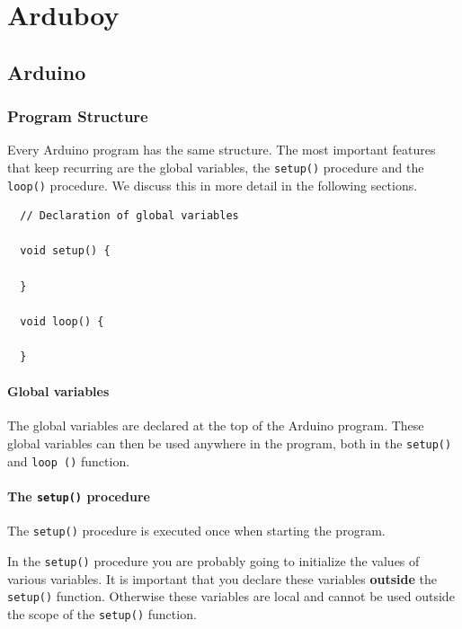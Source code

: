 \documentclass[11pt,fleqn]{book} %
\begin{document}
\part{Arduboy}

\chapter{Arduino}
\section{Program Structure}
Every Arduino program has the same structure. The most important features that keep recurring are the global variables, the \texttt{setup()} procedure and the \texttt{loop()} procedure. We discuss this in more detail in the following sections.

\begin{definition}
	\phantom{}
	\begin{verbatim}
  // Declaration of global variables

  void setup() {

  }

  void loop() {

  }
	\end{verbatim}
	\vspace{0cm}
\end{definition}

\subsection{Global variables}
The global variables are declared at the top of the Arduino program. These global variables can then be used anywhere in the program, both in the \texttt{setup()} and \texttt{loop ()} function.

\subsection{The \texttt{setup()} procedure}
The \texttt{setup()} procedure is executed once when starting the program.

\begin{remark}
    In the \texttt{setup()} procedure you are probably going to initialize the values of various variables. It is important that you declare these variables \textbf{outside} the \texttt{setup()} function. Otherwise these variables are local and cannot be used outside the scope of the \texttt{setup()} function.
\end{remark}
\end{document}
